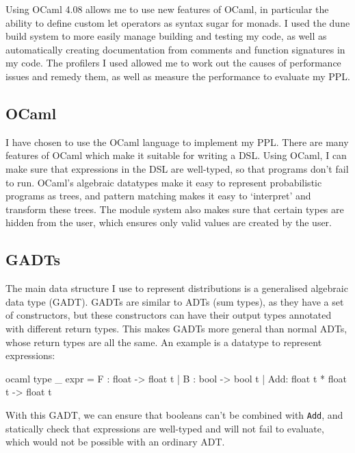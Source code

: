 Using OCaml 4.08 allows me to use new features of OCaml, in particular the ability to define custom let operators as syntax sugar for monads. I used the dune build system to more easily manage building and testing my code, as well as automatically creating documentation from comments and function signatures in my code. The profilers I used allowed me to work out the causes of performance issues and remedy them, as well as measure the performance to evaluate my PPL.

\subsection{OCaml}
I have chosen to use the OCaml language to implement my PPL. There are many features of OCaml which make it suitable for writing a DSL. Using OCaml, I can make sure that expressions in the DSL are well-typed, so that programs don't fail to run. OCaml's algebraic datatypes make it easy to represent probabilistic programs as trees, and pattern matching makes it easy to `interpret' and transform these trees. The module system also makes sure that certain types are hidden from the user, which ensures only valid values are created by the user.

\subsection{GADTs}
The main data structure I use to represent distributions is a generalised algebraic data type (GADT). GADTs are similar to ADTs (sum types), as they have a set of constructors, but these constructors can have their output types annotated with different return types. This makes GADTs more general than normal ADTs, whose return types are all the same. An example is a datatype to represent expressions:

\begin{listing}
\centering
\begin{cminted}{ocaml}
type _ expr = 
    F : float -> float t 
  | B : bool -> bool t 
  | Add: float t * float t -> float t
\end{cminted}
\end{listing}
	
With this GADT, we can ensure that booleans can't be combined with \texttt{Add}, and statically check that expressions are well-typed and will not fail to evaluate, which would not be possible with an ordinary ADT.
	
